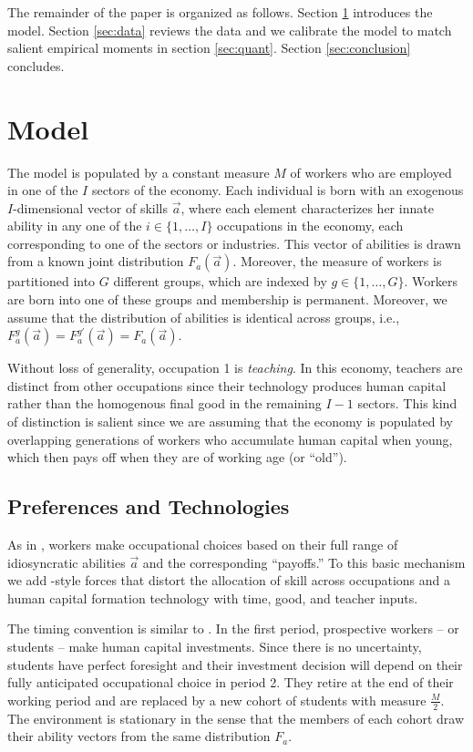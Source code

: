 \documentclass[onehalfspacing,11pt]{article}
\begin{document}
The remainder of the paper is organized as follows. Section \ref{sec:model} introduces the model. Section \ref{sec:data} reviews the data and we calibrate the model to match salient empirical moments in section \ref{sec:quant}. Section \ref{sec:conclusion} concludes.

\section{Model}\label{sec:model}
The model is populated by a constant measure $M$ of workers who are employed in one of the $I$ sectors of the economy. Each individual is born with an exogenous $I$-dimensional vector of skills $\vec{a}$, where each element characterizes her innate ability in any one of the $i \in \{1,\ldots,I\}$ occupations in the economy, each corresponding to one of the sectors or industries. This vector of abilities is drawn from a known joint distribution $F_a(\vec{a})$. Moreover, the measure of workers is partitioned into $G$ different groups, which are indexed by $g \in \{1,\dots,G \}$. Workers are born into one of these groups and membership is permanent. Moreover, we assume that the distribution of abilities is identical across groups, i.e., $F_a^g(\vec{a}) = F_a^{g'}(\vec{a}) = F_a(\vec{a})$.

Without loss of generality, occupation 1 is \textit{teaching}. In this economy, teachers are distinct from other occupations since their technology produces human capital rather than the homogenous final good in the remaining $I-1$ sectors. This kind of distinction is salient since we are assuming that the economy is populated by overlapping generations of workers who accumulate human capital when young, which then pays off when they are of working age (or ``old'').
\subsection{Preferences and Technologies}\label{sec:workers}
As in \cite{Roy:1951}, workers make occupational choices based on their full range of idiosyncratic abilities $\vec{a}$ and the corresponding ``payoffs.'' To this basic mechanism we add \cite{Hsieh:2018}-style forces that distort the allocation of skill across occupations and a human capital formation technology with time, good, and teacher inputs.

The timing convention is similar to \cite{Hsieh:2018}. In the first period, prospective workers -- or students -- make human capital investments. Since there is no uncertainty, students have perfect foresight and their investment decision will depend on their fully anticipated occupational choice in period 2. They retire at the end of their working period and are replaced by a new cohort of students with measure $\tfrac{M}{2}$. The environment is stationary in the sense that the members of each cohort draw their ability vectors from the same distribution $F_a$.
\end{document}
